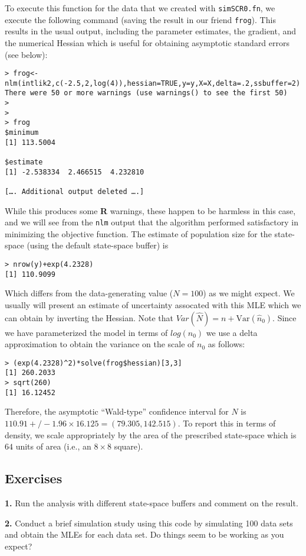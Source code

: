 To execute this function for the data that we created with \mbox{\tt simSCR0.fn},
 we execute the following command (saving the result in our
friend \mbox{\tt frog}).
This results in the usual output, including the parameter estimates,
the gradient, and the numerical Hessian which is useful for obtaining
asymptotic standard errors (see below):
\begin{verbatim}
> frog<-nlm(intlik2,c(-2.5,2,log(4)),hessian=TRUE,y=y,X=X,delta=.2,ssbuffer=2)
There were 50 or more warnings (use warnings() to see the first 50)
> 
>
> frog
$minimum
[1] 113.5004

$estimate
[1] -2.538334  2.466515  4.232810

[…. Additional output deleted ….]
\end{verbatim}
While this produces some {\bf R} warnings, these happen to be harmless
in this case, and we will see from the \mbox{\tt nlm} output that the
algorithm performed satisfactory in minimizing the objective function.
The estimate of population size for the state-space (using the default 
state-space buffer) is
\begin{verbatim}
> nrow(y)+exp(4.2328)
[1] 110.9099
\end{verbatim}
Which differs from the data-generating value ($N=100$) as we might
expect. We usually will present an estimate of uncertainty assocated
with this MLE which we can obtain by inverting the Hessian. Note that
$Var(\hat{N}) = n + \mbox{Var}(\hat{n}_{0})$.
Since we
have parameterized the model in terms of $log(n_{0})$ we use a delta
approximation to obtain the variance on the scale of $n_{0}$ as
follows:
\begin{verbatim}
> (exp(4.2328)^2)*solve(frog$hessian)[3,3]
[1] 260.2033
> sqrt(260)
[1] 16.12452
\end{verbatim}
Therefore, the asymptotic ``Wald-type'' confidence interval for $N$ is
$110.91 +/- 1.96 \times 16.125 = (79.305, 142.515)$. To report this in
terms of density, we scale appropriately by the area of the prescribed
state-space which is $64$ units of area (i.e., an $8 \times 8$ square).

\subsection{Exercises}

{\flushleft 
{\bf 1.}	
Run the analysis with different state-space buffers and comment on the result. 
}


{\flushleft 
{\bf 2.} Conduct a brief simulation study using this code by
  simulating 100 data sets and obtain the MLEs for each data set. Do
  things seem to be working as you expect?  }

